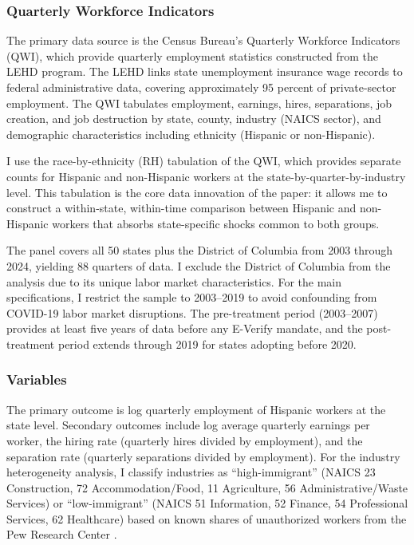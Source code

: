 \documentclass[12pt]{article}
\begin{document}
\subsubsection*{Quarterly Workforce Indicators} The primary data source is the Census Bureau's Quarterly Workforce Indicators (QWI), which provide quarterly employment statistics constructed from the LEHD program. The LEHD links state unemployment insurance wage records to federal administrative data, covering approximately 95 percent of private-sector employment. The QWI tabulates employment, earnings, hires, separations, job creation, and job destruction by state, county, industry (NAICS sector), and demographic characteristics including ethnicity (Hispanic or non-Hispanic).

I use the race-by-ethnicity (RH) tabulation of the QWI, which provides separate counts for Hispanic and non-Hispanic workers at the state-by-quarter-by-industry level. This tabulation is the core data innovation of the paper: it allows me to construct a within-state, within-time comparison between Hispanic and non-Hispanic workers that absorbs state-specific shocks common to both groups.

The panel covers all 50 states plus the District of Columbia from 2003 through 2024, yielding 88 quarters of data. I exclude the District of Columbia from the analysis due to its unique labor market characteristics. For the main specifications, I restrict the sample to 2003--2019 to avoid confounding from COVID-19 labor market disruptions. The pre-treatment period (2003--2007) provides at least five years of data before any E-Verify mandate, and the post-treatment period extends through 2019 for states adopting before 2020.

\subsubsection*{Variables} The primary outcome is log quarterly employment of Hispanic workers at the state level. Secondary outcomes include log average quarterly earnings per worker, the hiring rate (quarterly hires divided by employment), and the separation rate (quarterly separations divided by employment). For the industry heterogeneity analysis, I classify industries as ``high-immigrant'' (NAICS 23 Construction, 72 Accommodation/Food, 11 Agriculture, 56 Administrative/Waste Services) or ``low-immigrant'' (NAICS 51 Information, 52 Finance, 54 Professional Services, 62 Healthcare) based on known shares of unauthorized workers from the Pew Research Center \citep{pew2024unauthorized}.
\end{document}
